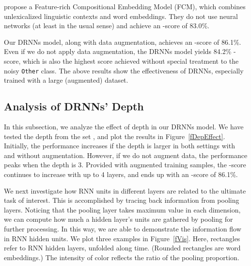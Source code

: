 \documentclass[11pt]{article}
\begin{document}
 propose a Feature-rich Compositional Embedding Model (FCM), which combines unlexicalized linguistic contexts and word embeddings.
They do not use neural networks (at least in the usual sense) and achieve an -score of 83.0\%.

Our DRNNs model, along with data augmentation, achieves an -score of 86.1\%. Even if we do not apply data augmentation, the DRNNs model yields 84.2\% -score, which is also the highest score achieved without special treatment to the noisy \texttt{Other} class. The above results show the effectiveness of DRNNs, especially trained with a large (augmented) dataset.




\subsection{Analysis of DRNNs' Depth}\label{ssDRNNsDepth}


\begin{figwindow}
In this subsection, we analyze the effect of depth in our DRNNs model.
We have tested the depth from the set , and plot the results in Figure~\ref{fDepEffect}. Initially, the performance increases if the depth is larger in both settings with and without augmentation. However, if we do not augment data, the performance peaks when the depth is 3. Provided with augmented training samples, the -score continues to increase with up to 4 layers, and ends up with an -score of 86.1\%.

\indent We next investigate how RNN units in different layers are related to the ultimate task of interest. This is accomplished by tracing back information from pooling layers. Noticing that the pooling layer takes maximum value in each dimension, we can compute how much a hidden layer's units are gathered by pooling for further processing. In this way, we are able to demonstrate the information flow in RNN hidden units. We plot three examples in Figure~\ref{fVis}. Here, rectangles refer to RNN hidden layers, unfolded along time. (Rounded rectangles are word embeddings.) The intensity of color reflects the ratio of the pooling proportion.
\end{figwindow}
\end{document}
